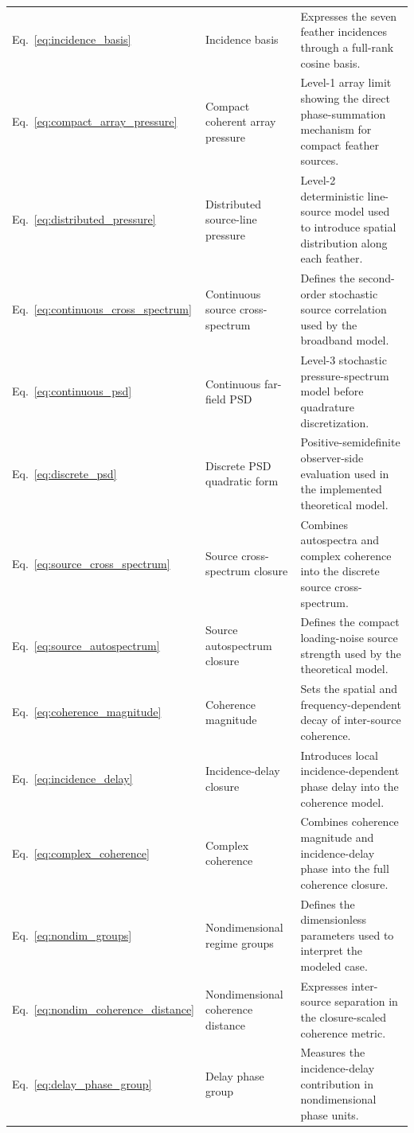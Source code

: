 \documentclass[11pt]{article}
\begin{document}
\begin{longtable}{@{}L{0.15\textwidth}L{0.27\textwidth}L{0.52\textwidth}@{}}
Eq.~\ref{eq:incidence_basis} & Incidence basis & Expresses the seven feather incidences through a full-rank cosine basis. \\
Eq.~\ref{eq:compact_array_pressure} & Compact coherent array pressure & Level-1 array limit showing the direct phase-summation mechanism for compact feather sources. \\
Eq.~\ref{eq:distributed_pressure} & Distributed source-line pressure & Level-2 deterministic line-source model used to introduce spatial distribution along each feather. \\
Eq.~\ref{eq:continuous_cross_spectrum} & Continuous source cross-spectrum & Defines the second-order stochastic source correlation used by the broadband model. \\
Eq.~\ref{eq:continuous_psd} & Continuous far-field PSD & Level-3 stochastic pressure-spectrum model before quadrature discretization. \\
Eq.~\ref{eq:discrete_psd} & Discrete PSD quadratic form & Positive-semidefinite observer-side evaluation used in the implemented theoretical model. \\
Eq.~\ref{eq:source_cross_spectrum} & Source cross-spectrum closure & Combines autospectra and complex coherence into the discrete source cross-spectrum. \\
Eq.~\ref{eq:source_autospectrum} & Source autospectrum closure & Defines the compact loading-noise source strength used by the theoretical model. \\
Eq.~\ref{eq:coherence_magnitude} & Coherence magnitude & Sets the spatial and frequency-dependent decay of inter-source coherence. \\
Eq.~\ref{eq:incidence_delay} & Incidence-delay closure & Introduces local incidence-dependent phase delay into the coherence model. \\
Eq.~\ref{eq:complex_coherence} & Complex coherence & Combines coherence magnitude and incidence-delay phase into the full coherence closure. \\
Eq.~\ref{eq:nondim_groups} & Nondimensional regime groups & Defines the dimensionless parameters used to interpret the modeled case. \\
Eq.~\ref{eq:nondim_coherence_distance} & Nondimensional coherence distance & Expresses inter-source separation in the closure-scaled coherence metric. \\
Eq.~\ref{eq:delay_phase_group} & Delay phase group & Measures the incidence-delay contribution in nondimensional phase units. \\

\end{longtable}
\end{document}
